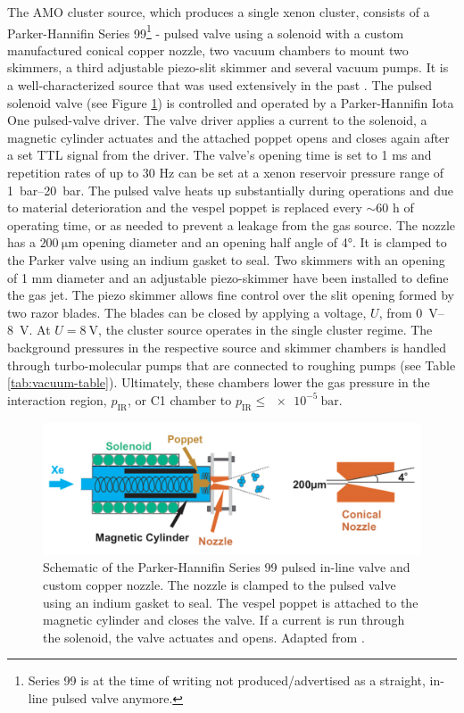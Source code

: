 The AMO cluster source, which produces a single xenon cluster, consists of a Parker-Hannifin Series 99\footnote{Series 99 is at the time of writing not produced/advertised as a straight, in-line pulsed valve anymore.} - pulsed valve using a solenoid with a custom manufactured conical copper nozzle, two vacuum chambers to mount two skimmers, a third adjustable piezo-slit skimmer and several vacuum pumps. It is a well-characterized source that was used extensively in the past \citep{Ferguson-2016-SciAdv,Ferguson-2015-JSR,Gorkhover-2012-PRL,Gorkhover-2016-NatPho,Rupp-2014-JCP}. The pulsed solenoid valve (see Figure \ref{fig:parker-valve}) is controlled and operated by a Parker-Hannifin Iota One pulsed-valve driver. The valve driver applies a current to the solenoid, a magnetic cylinder actuates and the attached poppet opens and closes again after a set TTL signal from the driver. The valve's opening time is set to 1 ms and repetition rates of up to $30$ Hz can be set at a xenon reservoir pressure range of \SIrange{1}{20}{\bar}. The pulsed valve heats up substantially during operations and due to material deterioration and the vespel poppet is replaced every $\sim 60$ h of operating time, or as needed to prevent a leakage from the gas source. The nozzle has a $\SI{200}{\micro\meter}$ opening diameter and an opening half angle of \ang{4}. It is clamped to the Parker valve using an indium gasket to seal. Two skimmers with an opening of 1 mm diameter and an adjustable piezo-skimmer have been installed to define the gas jet. The piezo skimmer allows fine control over the slit opening formed by two razor blades. The blades can be closed by applying a voltage, $U$, from \SIrange{0}{8}{\volt}. At $U=\SI{8}{\volt}$, the cluster source operates in the single cluster regime. The background pressures in the respective source and skimmer chambers is handled through turbo-molecular pumps that are connected to roughing pumps (see Table \ref{tab:vacuum-table}). Ultimately, these chambers lower the gas pressure in the interaction region, $p_{\text{IR}}$, or C1 chamber to $p_{\text{IR}}\leq \SI{e-5}{\bar}$.\\[1\baselineskip]
\begin{figure}
	\centering
		\includegraphics[width=1.00\textwidth]{images/parker-valve.jpg}
	\caption[Schematic of the Parker-Hannifin Series 99 valve.]{Schematic of the Parker-Hannifin Series 99 pulsed in-line valve and custom copper nozzle. The nozzle is clamped to the pulsed valve using an indium gasket to seal. The vespel poppet is attached to the magnetic cylinder and closes the valve. If a current is run through the solenoid, the valve actuates and opens. Adapted from \citep[\href{http://creativecommons.org/licenses/by-nc/3.0/us}{\ccbync}]{Ferguson-2016-PhD}.}
	\label{fig:parker-valve}
\end{figure}
